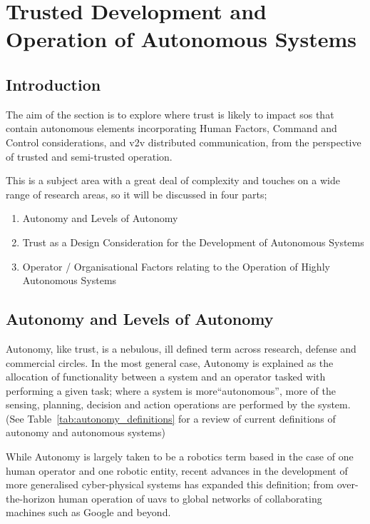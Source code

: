 \section{Trusted Development and Operation of Autonomous Systems}

\subsection{Introduction}

The aim of the section is to explore where trust is likely to impact \gls{sos} that contain autonomous elements incorporating Human Factors, Command and Control considerations, and \gls{v2v} distributed communication, from the perspective of trusted and semi-trusted operation.

This is a subject area with a great deal of complexity and touches on a wide range of research areas, so it will be discussed in four parts; 
 
\begin{enumerate}
  \item Autonomy and Levels of Autonomy
  \item Trust as a Design Consideration for the Development of Autonomous Systems
  \item Operator / Organisational Factors relating to the Operation of Highly Autonomous Systems
\end{enumerate}

\subsection{Autonomy and Levels of Autonomy}

Autonomy, like trust, is a nebulous, ill defined term across research, defense and commercial circles.
In the most general case, Autonomy is explained as the allocation of functionality between a system and an operator tasked with performing a given task; where a system is more``autonomous'', more of the sensing, planning, decision and action operations are performed by the system. (See Table~\ref{tab:autonomy_definitions} for a review of current definitions of autonomy and autonomous systems)

While Autonomy is largely taken to be a robotics term based in the case of one human operator and one robotic entity, recent advances in the development of more generalised cyber-physical systems has expanded this definition; from over-the-horizon human operation of \glspl{uav} to global networks of collaborating machines such as Google and beyond.


